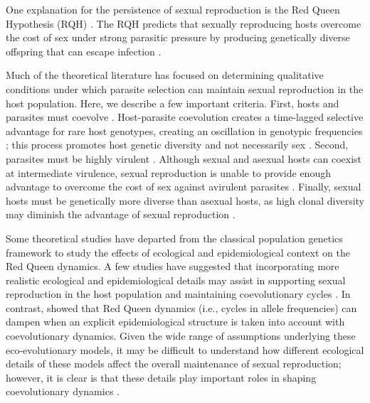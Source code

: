 \documentclass{article}\usepackage[]{graphicx}\usepackage[]{color}
\begin{document}
One explanation for the persistence of sexual reproduction is the Red Queen Hypothesis (RQH) \citep{bell1982masterpiece}.
The RQH predicts that sexually reproducing hosts overcome the cost of sex under strong parasitic pressure by producing genetically diverse offspring that can escape infection \citep{jbs1949disease, jaenike1978hypothesis, hamilton1980sex, hamilton1990sexual}.

Much of the theoretical literature has focused on determining qualitative conditions under which parasite selection can maintain sexual reproduction in the host population.
Here, we describe a few important criteria.
First, hosts and parasites must coevolve \citep{bell1982masterpiece, paterson2010antagonistic}.
Host-parasite coevolution creates a time-lagged selective advantage for rare host genotypes, creating an oscillation in genotypic frequencies \citep{jaenike1978hypothesis, hamilton1980sex, agrawal2001parasites}; this process promotes host genetic diversity and not necessarily sex \citep{king2009geographic, dagan2013clonal, ashby2015diversity}.
Second, parasites must be highly virulent \citep{may1983epidemiology}.
Although sexual and asexual hosts can coexist at intermediate virulence, sexual reproduction is unable to provide enough advantage to overcome the cost of sex against avirulent parasites \citep{howard1994parasitism}.
Finally, sexual hosts must be genetically more diverse than asexual hosts, as high clonal diversity may diminish the advantage of sexual reproduction \citep{lively1994selection, lively2010review, ashby2015diversity}.

Some theoretical studies have departed from the classical population genetics framework to study the effects of ecological and epidemiological context on the Red Queen dynamics.
A few studies have suggested that incorporating more realistic ecological and epidemiological details may assist in supporting sexual reproduction in the host population \citep{lively2009maintenance, lively2010epidemiological} and maintaining coevolutionary cycles \citep{ashby2014parasitic}.
In contrast, \cite{macpherson2018joint} showed that Red Queen dynamics (i.e., cycles in allele frequencies) can dampen when an explicit epidemiological structure is taken into account with coevolutionary dynamics.
Given the wide range of assumptions underlying these eco-evolutionary models, it may be difficult to understand how different ecological details of these models affect the overall maintenance of sexual reproduction;
however, it is clear is that these details play important roles in shaping coevolutionary dynamics \citep{song2015host, haafke2016eco, ashby2019understanding}.
\end{document}
